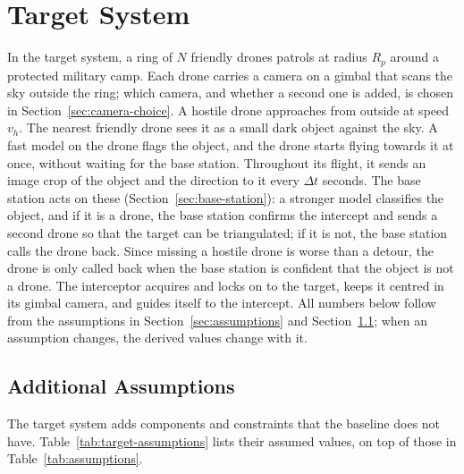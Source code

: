 \section{Target System}\label{sec:target}

In the target system, a ring of $N$ friendly drones patrols at radius $R_p$
around a protected military camp. Each drone carries a camera on a gimbal
that scans the sky outside the ring; which camera, and whether a second one
is added, is chosen in Section~\ref{sec:camera-choice}. A hostile drone
approaches from outside at speed $v_h$. The nearest friendly drone sees it as
a small dark object against the sky. A fast model on the drone flags the
object, and the drone starts flying towards it at once, without waiting for
the base station. Throughout its flight, it sends an image crop of the object
and the direction to it every $\Delta t$ seconds. The base station acts on
these (Section~\ref{sec:base-station}): a stronger model classifies the
object, and if it is a drone, the base station confirms the intercept and
sends a second drone so that the target can be triangulated; if it is not,
the base station calls the drone back. Since missing a hostile drone is worse
than a detour, the drone is only called back when the base station is
confident that the object is not a drone. The interceptor acquires and locks
on to the target, keeps it centred in its gimbal camera, and guides itself to
the intercept. All
numbers below follow from the assumptions in Section~\ref{sec:assumptions} and
Section~\ref{sec:target-assumptions}; when an assumption changes, the derived
values change with it.

\subsection{Additional Assumptions}
\label{sec:target-assumptions}

The target system adds components and constraints that the baseline does not
have. Table~\ref{tab:target-assumptions} lists their assumed values, on top of
those in Table~\ref{tab:assumptions}.


